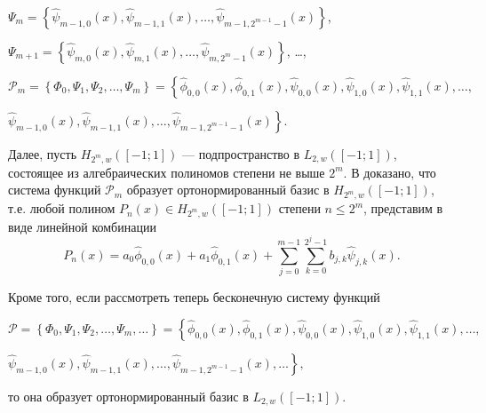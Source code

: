 $\Psi_{m} =  \left\{\hat{\psi}_{m-1,0}(x), \hat{\psi}_{m-1,1}(x), \ldots, \hat{\psi}_{m-1, 2^{m-1}-1}(x)  \right\}$,

$\Psi_{m+1} =  \left\{\hat{\psi}_{m,0}(x), \hat{\psi}_{m,1}(x), \ldots, \hat{\psi}_{m, 2^{m}-1}(x)  \right\}$, \ldots,

$\mathcal{P}_m = \left\{\Phi_{0}, \Psi_1, \Psi_2, \ldots, \Psi_m \right\} =
\left\{\hat{\phi}_{0,0}(x), \hat{\phi}_{0,1}(x), \hat{\psi}_{0,0}(x), \hat{\psi}_{1,0}(x), \hat{\psi}_{1,1}(x), \ldots, \right.$

$\left. \hat{\psi}_{m-1,0}(x), \hat{\psi}_{m-1,1}(x), \ldots, \hat{\psi}_{m-1, 2^{m-1}-1}(x) \right\}$.

Далее, пусть $H_{2^{m}, w}([-1; 1])$ --- подпространство в $L_{2, w}([-1; 1])$, состоящее из алгебраических полиномов степени не выше $2^{m}$. В \cite{sms11}
доказано, что система функций $\mathcal{P}_m$ образует ортонормированный базис в $H_{2^{m}, w}([-1; 1])$, т.е. любой полином $P_{n}(x) \in H_{2^{m}, w}([-1; 1])$ степени $n \leq 2^{m}$,
представим в виде линейной комбинации
\begin{equation}
\label{sms1polydistr}
P_{n}(x) = a_{0}\hat{\phi}_{0,0}(x) + a_{1}\hat{\phi}_{0,1}(x) + \sum\limits_{j=0}^{m-1} \sum\limits_{k=0}^{2^j-1} b_{j,k}\hat{\psi}_{j,k}(x).
\end{equation}

\noindent Кроме того, если рассмотреть теперь бесконечную систему функций

$\mathcal{P} = \left\{\Phi_{0}, \Psi_1, \Psi_2, \ldots, \Psi_m, \ldots \right\} =
\left\{\hat{\phi}_{0,0}(x), \hat{\phi}_{0,1}(x), \hat{\psi}_{0,0}(x), \hat{\psi}_{1,0}(x), \hat{\psi}_{1,1}(x), \ldots,\right.$

$\left. \hat{\psi}_{m-1,0}(x), \hat{\psi}_{m-1,1}(x), \ldots, \hat{\psi}_{m-1, 2^{m-1}-1}(x), \ldots \right\},$

\noindent то она образует ортонормированный базис в $L_{2, w}([-1; 1])$.


